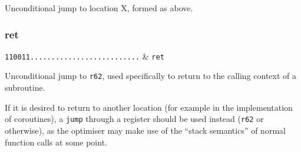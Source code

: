 Unconditional jump to location X, formed as above.

\subsubsection{ret}

\decfmt
\texttt{110011..........................} & \texttt{ret}
\finfmt

Unconditional jump to \texttt{r62}, used specifically to return to the calling context of a subroutine.

If it is desired to return to another location (for example in the implementation of coroutines), a \texttt{jump} through a register should be used instead (\texttt{r62} or otherwise), as the optimiser may make use of the ``stack semantics'' of normal function calls at some point.
